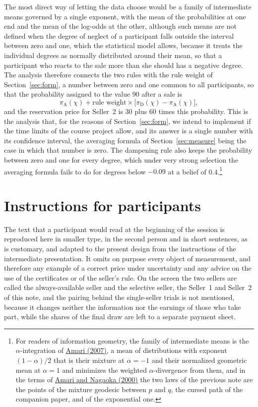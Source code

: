 \documentclass[11pt,a4paper]{article}
\newcommand{\cy}[2]{\hyperlink{cite.#1}{\textcolor{citecolor}{#2}}}
\begin{document}
The most direct way of letting the data choose would be a family of intermediate means governed by a single exponent, with the mean of the probabilities at one end and the mean of the log-odds at the other, although such means are not defined when the degree of neglect of a participant falls outside the interval between zero and one, which the statistical model allows, because it treats the individual degrees as normally distributed around their mean, so that a participant who reacts to the sale more than she should has a negative degree. The analysis therefore connects the two rules with the rule weight of Section~\ref{sec:form}, a number between zero and one common to all participants, so that the probability assigned to the value 90 after a sale is
\[
\pi_{\mathrm{A}}(\chi)+\text{rule weight}\times\bigl[\pi_{\mathrm{D}}(\chi)-\pi_{\mathrm{A}}(\chi)\bigr],
\]
and the reservation price for Seller~2 is 30 plus 60 times this probability. This is the analysis that, for the reasons of Section~\ref{sec:form}, we intend to implement if the time limits of the course project allow, and its answer is a single number with its confidence interval, the averaging formula of Section~\ref{sec:measure} being the case in which that number is zero. The dampening rule also keeps the probability between zero and one for every degree, which under very strong selection the averaging formula fails to do for degrees below $-0.09$ at a belief of 0.4.\footnote{For readers of information geometry, the family of intermediate means is the $\alpha$-integration of \cy{amari}{Amari (2007)}, a mean of distributions with exponent $(1-\alpha)/2$ that is their mixture at $\alpha=-1$ and their normalized geometric mean at $\alpha=1$ and minimizes the weighted $\alpha$-divergence from them, and in the terms of \cy{amarinagaoka}{Amari and Nagaoka (2000)} the two laws of the previous note are the points of the mixture geodesic between $p$ and $q$, the cursed path of the companion paper, and of the exponential one.}

\section{Instructions for participants}\label{sec:instructions}

The text that a participant would read at the beginning of the session is reproduced here in smaller type, in the second person and in short sentences, as is customary, and adapted to the present design from the instructions of the intermediate presentation. It omits on purpose every object of measurement, and therefore any example of a correct price under uncertainty and any advice on the use of the certificates or of the seller's rule. On the screen the two sellers are called the always-available seller and the selective seller, the Seller~1 and Seller~2 of this note, and the pairing behind the single-seller trials is not mentioned, because it changes neither the information nor the earnings of those who take part, while the shares of the final draw are left to a separate payment sheet.
\end{document}
